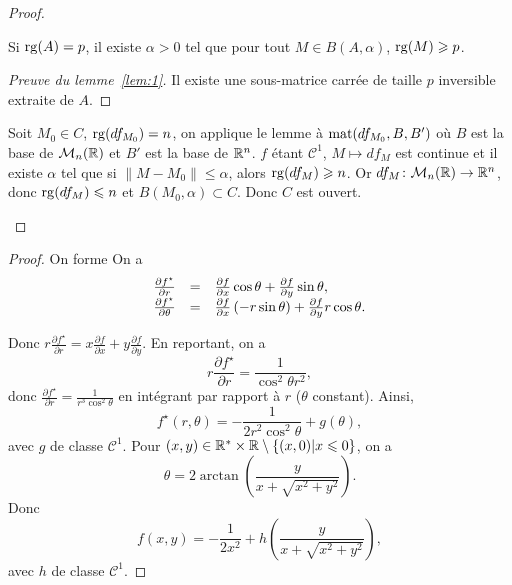 \documentclass[12pt]{article}
\begin{document}
\begin{proof}
\begin{enumerate}
		\begin{lemma}
			\label{lem:1}
			Si $\operatorname{rg}(A)=p$, il existe $\alpha>0$ tel que pour tout $M\in B(A,\alpha)$, $\operatorname{rg}(M)\geqslant p$.
		\end{lemma}
		\begin{proof}[Preuve du lemme~\ref{lem:1}]
			Il existe une sous-matrice carrée de taille $p$ inversible extraite de $A$.
		\end{proof}

		Soit $M_0\in C$, $\operatorname{rg}(df_{M_0})=n$, on applique le lemme à $\operatorname{mat}(df_{M_{0}},B,B')$ où $B$ est la base de $\mathcal{M}_n(\mathbb{R})$ et $B'$ est la base de $\mathbb{R}^{n}$. $f$ étant $\mathcal{C}^{1}$, $M\mapsto df_M$ est continue et il existe $\alpha$ tel que si $\left\lVert M-M_0\right\rVert\leqslant\alpha$, alors $\operatorname{rg}(df_M)\geqslant n$. Or $df_M\colon\mathcal{M}_n(\mathbb{R})\to\mathbb{R}^{n}$, donc $\operatorname{rg}(df_M)\leqslant n$ et $B(M_0,\alpha)\subset C$. Donc $C$ est ouvert.
	\end{enumerate}
\end{proof}

\begin{proof}
	On forme 
	On a 
	\begin{equation}
		\begin{array}[]{rcl}
			\frac{\partial f^{\star}}{\partial r}&=&\frac{\partial f}{\partial x}\cos\theta+\frac{\partial f}{\partial y}\sin\theta,\\
			\frac{\partial f^{\star}}{\partial \theta}&=&\frac{\partial f}{\partial x}\left(-r\sin\theta\right)+\frac{\partial f}{\partial y}r\cos\theta.
		\end{array}
	\end{equation}

	Donc $r\frac{\partial f^{\star}}{\partial r}=x\frac{\partial f}{\partial x}+y\frac{\partial f}{\partial y}$. En reportant, on a 
	\begin{equation}
		r\frac{\partial f^{\star}}{\partial r}=\frac{1}{\cos^{2}\theta r^{2}},
	\end{equation}
	donc $\frac{\partial f^{\star}}{\partial r}=\frac{1}{r^{3}\cos^{2}\theta}$ en intégrant par rapport à $r$ ($\theta$ constant). Ainsi,
	\begin{equation}
		f^{\star}(r,\theta)=-\frac{1}{2r^{2}\cos^{2}\theta}+g(\theta),
	\end{equation}
	avec $g$ de classe $\mathcal{C}^{1}$. Pour $(x,y)\in\mathbb{R}^{*}\times\mathbb{R}\setminus\left\lbrace (x,0)\middle| x\leqslant0\right\rbrace$, on a 
	\begin{equation}
		\theta=2\arctan\left(\frac{y}{x+\sqrt{x^{2}+y^{2}}}\right).
	\end{equation}
	Donc 
	\begin{equation}
		f(x,y)=-\frac{1}{2x^{2}}+h\left(\frac{y}{x+\sqrt{x^{2}+y^{2}}}\right),
	\end{equation}
	avec $h$ de classe $\mathcal{C}^{1}$.
\end{proof}
\end{document}
